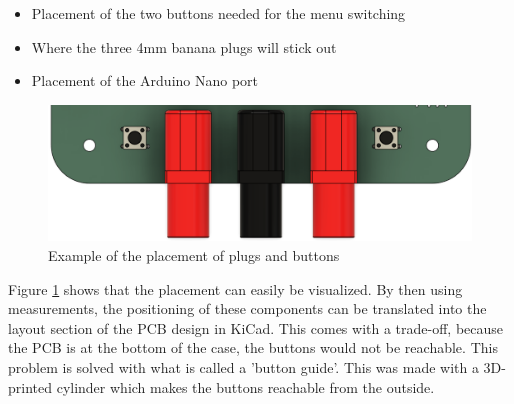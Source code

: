 \begin{itemize}
    \item Placement of the two buttons needed for the menu switching
    \item Where the three 4mm banana plugs will stick out
    \item Placement of the Arduino Nano port
\end{itemize}
\begin{figure}[h]
    \centering
    \includegraphics[width=\linewidth]{images/sketch-placement-plugsbut.png}
    \caption{Example of the placement of plugs and buttons}
    \label{fig:placeplugbut}
\end{figure}
Figure \ref{fig:placeplugbut} shows that the placement can easily be visualized. By then using measurements, the positioning of these components can be translated into the layout section of the PCB design in KiCad.
This comes with a trade-off, because the PCB is at the bottom of the case, the buttons would not be reachable. This problem is solved with what is called a 'button guide'. This was made with a 3D-printed cylinder which makes the buttons reachable from the outside.


